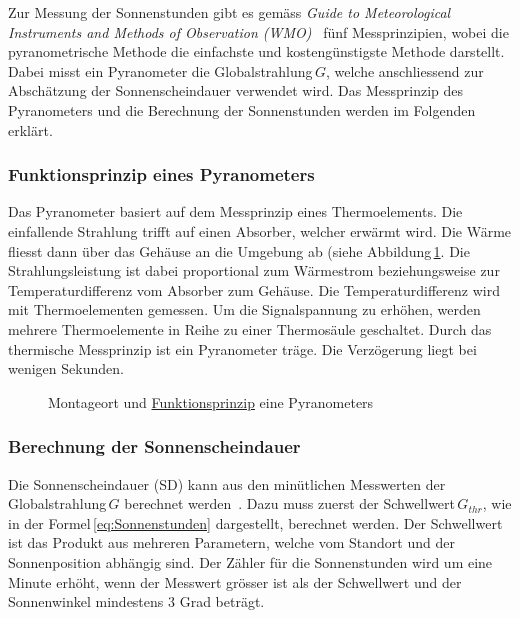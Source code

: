 \noindent
Zur Messung der Sonnenstunden gibt es gemäss \emph{Guide to Meteorological Instruments and Methods of Observation (WMO)}~\cite{WMO2014Gtmi} fünf Messprinzipien, wobei die pyranometrische Methode die einfachste und kostengünstigste Methode darstellt. Dabei misst ein Pyranometer die Globalstrahlung\,$G$, welche anschliessend zur Abschätzung der Sonnenscheindauer verwendet wird. Das Messprinzip des Pyranometers und die Berechnung der Sonnenstunden werden im Folgenden erklärt.

\subsubsection{Funktionsprinzip eines Pyranometers}
Das Pyranometer basiert auf dem Messprinzip eines Thermoelements. Die einfallende Strahlung trifft auf einen Absorber, welcher erwärmt wird. Die Wärme fliesst dann über das Gehäuse an die Umgebung ab (siehe Abbildung\,\ref{img:pyranometer}. Die Strahlungsleistung ist dabei proportional zum Wärmestrom beziehungsweise zur Temperaturdifferenz vom Absorber zum Gehäuse. Die Temperaturdifferenz wird mit Thermoelementen gemessen. Um die Signalspannung zu erhöhen, werden mehrere Thermoelemente in Reihe zu einer Thermosäule geschaltet. Durch das thermische Messprinzip ist ein Pyranometer träge. Die Verzögerung liegt bei wenigen Sekunden.

\begin{figure}[htbp]
	\centering
	\caption{Montageort und \href{http://www.kippzonen.com/News/572/The-Working-Principle-of-a-Thermopile-Pyranometer}{Funktionsprinzip} eine Pyranometers }
	\label{img:pyranometer}
\end{figure}


\subsubsection{Berechnung der Sonnenscheindauer}
Die Sonnenscheindauer (SD) kann aus den minütlichen Messwerten der Globalstrahlung\,$G$ berechnet werden~\cite{WMO2014Gtmi}. Dazu muss zuerst der Schwellwert\,$G_{thr}$, wie in der Formel\,\ref{eq:Sonnenstunden} dargestellt, berechnet werden. Der Schwellwert ist das Produkt aus mehreren Parametern, welche vom Standort und der Sonnenposition abhängig sind. Der Zähler für die Sonnenstunden wird um eine Minute erhöht, wenn der Messwert grösser ist als der Schwellwert und der Sonnenwinkel mindestens 3 Grad beträgt.

